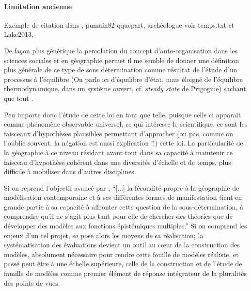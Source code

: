 \paragraph{Limitation ancienne}
Exemple de citation dans \textcite[192]{Sheps1971}, pumain82 qquepart, archéologue voir temps.txt et Lake2013, 

De façon plus générique la percolation du concept d'auto-organisation dans les sciences sociales et en géographie permet il me semble de donner une définition plus générale de ce type de sous détermination comme résultat de l'étude d'un processus à l'équilibre (On parle ici d'équilibre d'état, mais éloigné de l'équilibre thermodynamique, dans un système ouvert, cf. \textit{steady state} de Prigogine) sachant que tout . 

Peu importe donc l'étude de cette loi en tant que telle, puisque celle ci apparaît comme phénomène observable universel, ce qui intéresse le scientifique, ce sont les faisceaux d'hypothèses plausibles permettant d'approcher (ou pas, comme on l'oublie souvent, la négation est aussi explication !!) cette loi. La particularité de la géographie à ce niveau résidant avant tout dans sa capacité à maintenir ce faisceau d'hypothèse cohérent dans une diversités d'échelle et de temps, plus difficile à mobiliser dans d'autres disciplines.

Si on reprend l'objectif avancé par \autocite{Varenne2014}, \enquote{[...] la fécondité propre à la géographie de modélisation contemporaine et à ses différentes formes de manifestation tient en grande partie à sa capacité à affronter cette question de la sous-détermination, à comprendre qu’il ne s’agit plus tant pour elle de chercher des théories que de développer des modèles aux fonctions épistémiques multiples.} Si on comprend les enjeux d'un tel projet, se pose alors les moyens de sa réalisation; la systématisation des évaluations devient un outil au cœur de la construction des modèles, absolument nécessaire pour rendre cette fouille de modèles réaliste, et passé peut être à une échelle supérieure, celle de la construction et de l'étude de famille de modèles comme premier élément de réponse intégrateur de la pluralités des points de vues.



